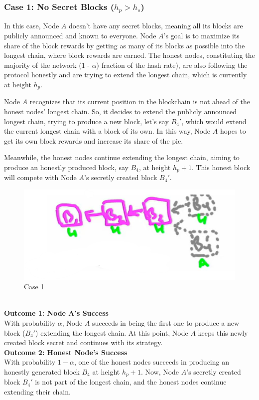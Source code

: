 \subsubsection{Case 1: No Secret Blocks ($h_p > h_s$)}
In this case, Node $A$ doesn't have any secret blocks, meaning all its blocks are publicly announced and known to everyone. Node $A$'s goal is to maximize its share of the block rewards by getting as many of its blocks as possible into the longest chain, where block rewards are earned. The honest nodes, constituting the majority of the network (1 - $\alpha$) fraction of the hash rate), are also following the protocol honestly and are trying to extend the longest chain, which is currently at height $h_p$.

Node $A$ recognizes that its current position in the blockchain is not ahead of the honest nodes' longest chain. So, it decides to extend the publicly announced longest chain, trying to produce a new block, let's say $B_{4}'$, which would extend the current longest chain with a block of its own. In this way, Node $A$ hopes to get its own block rewards and increase its share of the pie.

Meanwhile, the honest nodes continue extending the longest chain, aiming to produce an honestly produced block, say $B_{4}$, at height $h_p +1$. This honest block will compete with Node $A$'s secretly created block $B_{4}'$.\\

\begin{figure}[h]
    \centering
    \includegraphics[scale = 0.5]{figures/f44.png}
    \caption{Case 1}
    \label{fig:mesh1}
\end{figure}\\

\noindent
\textbf{Outcome 1: Node A's Success}\\
With probability $\alpha$, Node $A$ succeeds in being the first one to produce a new block ($B_{4}'$) extending the longest chain. At this point, Node $A$ keeps this newly created block secret and continues with its strategy.\\
\noindent
\textbf{Outcome 2: Honest Node's Success}\\
With probability $1-\alpha$, one of the honest nodes succeeds in producing an honestly generated block $B_{4}$ at height $h_p +1$. Now, Node $A$'s secretly created block $B_{4}'$ is not part of the longest chain, and the honest nodes continue extending their chain.\\

